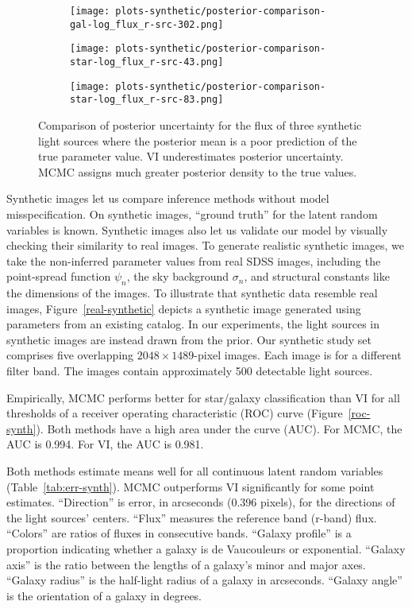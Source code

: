 \begin{figure}[b]
\begin{subfigure}{.32\textwidth}
  \centering
  \texttt{[image: plots-synthetic/posterior-comparison-gal-log\_flux\_r-src-302.png]}
  \caption{}
\end{subfigure}
\begin{subfigure}{.32\textwidth}
  \centering
  \texttt{[image: plots-synthetic/posterior-comparison-star-log\_flux\_r-src-43.png]}
  \caption{}
\end{subfigure}
\begin{subfigure}{.32\textwidth}
  \centering
  \texttt{[image: plots-synthetic/posterior-comparison-star-log\_flux\_r-src-83.png]}
  \caption{}
\end{subfigure}
  \caption{Comparison of posterior uncertainty for the flux of three synthetic light sources where the posterior mean is a poor prediction of the true parameter value. VI underestimates posterior uncertainty. MCMC assigns much greater posterior density to the true values.}
\label{uq-synth}
\end{figure}

Synthetic images let us compare inference methods without model misspecification.
On synthetic images, ``ground truth'' for the latent random variables is known.
Synthetic images also let us validate our model by visually checking their similarity to real images.
To generate realistic synthetic images, we take the non-inferred parameter values from real SDSS images, including the point-spread function $\psi_n$, the sky background $\sigma_n$, and structural constants like the dimensions of the images.
To illustrate that synthetic data resemble real images, Figure~\ref{real-synthetic} depicts a synthetic image generated using parameters from an existing catalog.
In our experiments, the light sources in synthetic images are instead drawn from the prior.
Our synthetic study set comprises five overlapping $2048 \times 1489$-pixel images.
Each image is for a different filter band.
The images contain approximately 500 detectable light sources.

Empirically, MCMC performs better for star/galaxy classification than VI for all thresholds of a receiver operating characteristic (ROC) curve (Figure~\ref{roc-synth}).
Both methods have a high area under the curve (AUC).
For MCMC, the AUC is 0.994. For VI, the AUC is 0.981.

Both methods estimate means well for all continuous latent random variables (Table~\ref{tab:err-synth}).
MCMC outperforms VI significantly for some point estimates.
``Direction'' is error, in arcseconds (0.396 pixels), for the directions of the light sources'
centers.
``Flux'' measures the reference band (r-band) flux.
``Colors'' are ratios of fluxes in consecutive bands.
``Galaxy profile'' is a proportion indicating whether a galaxy is de Vaucouleurs
or exponential.
``Galaxy axis'' is the ratio between the lengths of a galaxy's minor and
major axes.
``Galaxy radius'' is the half-light radius of a galaxy in arcseconds.
``Galaxy angle'' is the orientation of a galaxy in degrees.

